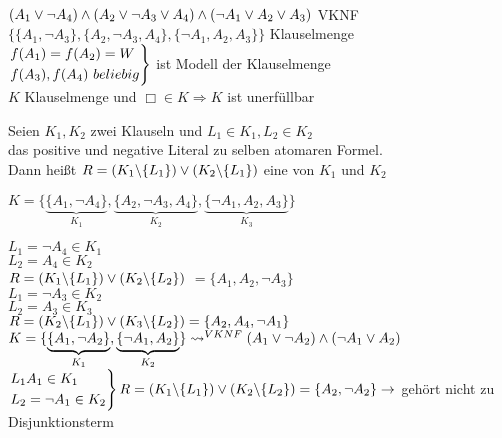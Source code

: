 \beispiel{}\\
$(A_1 \vee \neg A_4) \wedge (A_2 \vee \neg A_3 \vee A_4) \wedge ( \neg A_1 \vee A_2 \vee A_3)$ VKNF\\
$\{ \{ A_1, \neg A_3 \}, \{ A_2, \neg A_3, A_4 \}, \{ \neg A_1, A_2, A_3 \} \}$ Klauselmenge\\

$\begin{rcases} f(A_1) = f(A_2) = W \\ f(A_3), f(A_4)\ beliebig \end{rcases}$ ist Modell der Klauselmenge\\

\bemerkung{}
$K$ Klauselmenge und $\Box \in K \Rightarrow K$ ist unerfüllbar

Seien $K_1, K_2$ zwei Klauseln und $L_1 \in K_1, L_2 \in K_2$\\
das positive und negative Literal zu selben atomaren Formel.\\

Dann heißt $R = (K_1 \backslash \{L_1\}) \vee (K_2 \backslash \{L_1\})$ eine  von $K_1$ und $K_2$

\beispiel{}
$K = \{ \underbrace{ \{ A_1, \neg A_4 \} }_{K_1}, \underbrace{ \{ A_2, \neg A_3, A_4 \} }_{K_2}, \underbrace{ \{ \neg A_1, A_2, A_3 \} }_{K_3} \}$

$L_1 = \neg A_4 \in K_1$\\
$L_2 = A_4 \in K_2$\\
$R = (K_1 \backslash \{ L_1 \}) \vee (K_2 \backslash \{L_2\})$ $=\{A_1, A_2, \neg A_3\}$ \\

$L_1 = \neg A_3 \in K_2$\\
$L_2 = A_3 \in K_3$\\
$R = (K_2 \backslash \{L_1\}) \vee (K_3 \backslash \{L_2\}) = \{A_2, A_4, \neg A_1\}$\\

$K = \{ \underbrace{ \{ A_1, \neg A_2 \} }_{K_1}, \underbrace{ \{\neg A_1, A_2 \} }_{K_2} \} \rightsquigarrow^{VKNF} (A_1 \vee \neg A_2) \wedge (\neg A_1 \vee A_2)$\\

$\begin{rcases} L_1 A_1 \in K_1 \\ L_2 = \neg A_1 \in K_2 \end{rcases} R= (K_1 \backslash \{L_1\}) \vee (K_2 \backslash \{L_2\}) = \{A_2, \neg A_2\} \rightarrow$ gehört nicht zu Disjunktionsterm

